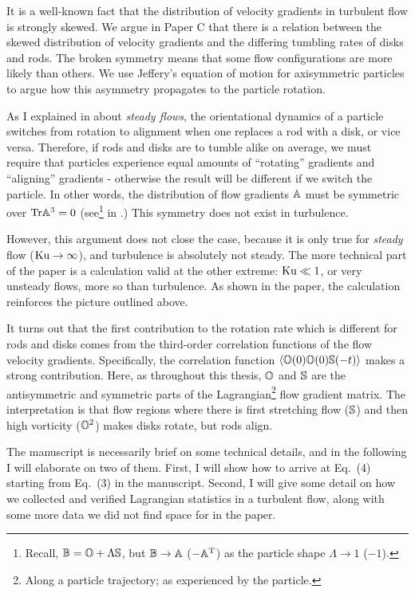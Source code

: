 \documentclass[thesis.tex]{subfiles}
\begin{document}
It is a well-known fact that the distribution of velocity gradients in turbulent flow is strongly skewed\cite{chertkov1999,luthi2009}. We argue in Paper C that there is a relation between the skewed distribution of velocity gradients and the differing tumbling rates of disks and rods. The broken symmetry means that some flow configurations are more likely than others. We use Jeffery's equation of motion for axisymmetric particles to argue how this asymmetry propagates to the particle rotation. 

As I explained in  about \emph{steady flows}, the orientational dynamics of a particle switches from rotation to alignment when one replaces a rod with a disk, or vice versa. Therefore, if rods and disks are to tumble alike on average, we must require that particles experience equal amounts of ``rotating'' gradients and ``aligning'' gradients - otherwise the result will be different if we switch the particle.
In other words, the distribution of flow gradients $\mathbb{A}$ must be symmetric over $\mbox{Tr} \mathbb{A}^3=0$ (see\footnote{Recall, $\mathbb{B}=\mathbb{O} + \Lambda\mathbb{S}$, but $\mathbb{B} \to \mathbb{A}$ ($-\mathbb{A}^{\mathrm T}$) as the particle shape $\Lambda\to 1$ ($-1$).}  in .) This symmetry does not exist in turbulence.

However, this argument does not close the case, because it is only true for \emph{steady} flow ($\mbox{Ku}\to\infty$), and turbulence is absolutely not steady. The more technical part of the paper is a calculation valid at the other extreme: $\mbox{Ku} \ll 1$, or very unsteady flows, more so than turbulence. As shown in the paper, the calculation reinforces the picture outlined above.

It turns out that the first contribution to the rotation rate which is different for rods and disks comes from the third-order correlation functions of the flow velocity gradients. Specifically, the correlation function $\langle \mathbb{O}(0) \mathbb{O}(0) \mathbb{S}(-t)\rangle$ makes a strong contribution. Here, as throughout this thesis, $\mathbb{O}$ and $\mathbb{S}$ are the antisymmetric and symmetric parts of the Lagrangian\footnote{Along a particle trajectory; as experienced by the particle.} flow gradient matrix. The interpretation is that flow regions where there is first stretching flow ($\mathbb{S}$) and then high vorticity ($\mathbb{O}^2$) makes disks rotate, but rods align.

The manuscript is necessarily brief on some technical details, and in the following I will elaborate on two of them. First, I will show how to arrive at Eq.~(4) starting from Eq.~(3) in the manuscript. Second, I will give some detail on how we collected and verified Lagrangian statistics in a turbulent flow, along with some more data we did not find space for in the paper.
\end{document}
